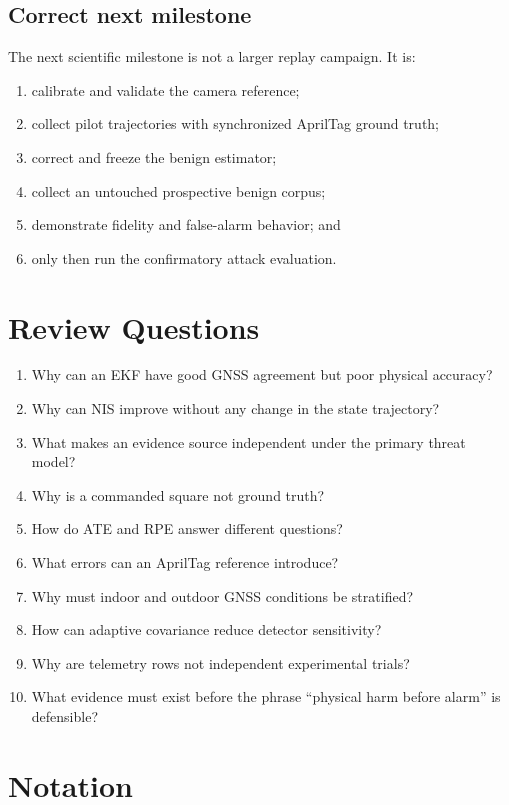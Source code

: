 \documentclass[11pt,oneside]{book}
\begin{document}
\section{Correct next milestone}

The next scientific milestone is not a larger replay campaign. It is:
\begin{enumerate}
  \item calibrate and validate the camera reference;
  \item collect pilot trajectories with synchronized AprilTag ground truth;
  \item correct and freeze the benign estimator;
  \item collect an untouched prospective benign corpus;
  \item demonstrate fidelity and false-alarm behavior; and
  \item only then run the confirmatory attack evaluation.
\end{enumerate}

\chapter{Review Questions}

\begin{enumerate}
  \item Why can an EKF have good GNSS agreement but poor physical accuracy?
  \item Why can NIS improve without any change in the state trajectory?
  \item What makes an evidence source independent under the primary threat
  model?
  \item Why is a commanded square not ground truth?
  \item How do ATE and RPE answer different questions?
  \item What errors can an AprilTag reference introduce?
  \item Why must indoor and outdoor GNSS conditions be stratified?
  \item How can adaptive covariance reduce detector sensitivity?
  \item Why are telemetry rows not independent experimental trials?
  \item What evidence must exist before the phrase ``physical harm before
  alarm'' is defensible?
\end{enumerate}

\appendix

\chapter{Notation}
\end{document}
